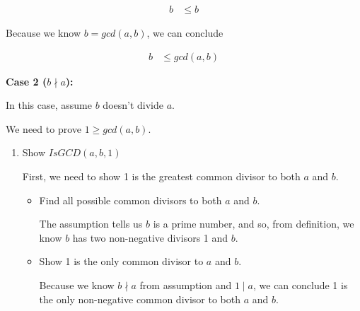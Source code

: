 \documentclass[12pt]{article}
\begin{document}
\begin{enumerate}[a.]
\begin{mdframed}
\begin{enumerate}[1.]
\begin{mdframed}
            \begin{align}
                b &\leq b
            \end{align}

            Because we know $b = gcd(a,b)$, we can conclude

            \begin{align}
                b &\leq gcd(a,b)
            \end{align}

            \end{mdframed}
        \end{enumerate}

        \bigskip

        \textbf{Case 2 ($b \nmid a$):}

        \bigskip

        In this case, assume $b$ doesn't divide $a$.

        \bigskip

        We need to prove $1 \geq gcd(a,b)$.

        \bigskip

        \begin{enumerate}[1.]
            \item Show $IsGCD(a,b,1)$

            First, we need to show 1 is the greatest common divisor to both $a$
            and $b$.

            \begin{itemize}
                \item Find all possible common divisors to both $a$ and $b$.

                \bigskip

                \begin{mdframed}

                The assumption tells us $b$ is a prime number, and so, from definition,
                we know $b$ has two non-negative divisors 1 and $b$.

                \end{mdframed}

                \item Show 1 is the only common divisor to $a$ and $b$.

                \begin{mdframed}

                Because we know $b \nmid a$ from assumption and $1 \mid a$, we
                can conclude 1 is the only non-negative common divisor to both
                $a$ and $b$.


\end{mdframed}
\end{itemize}
\end{enumerate}
\end{mdframed}
\end{enumerate}
\end{document}
